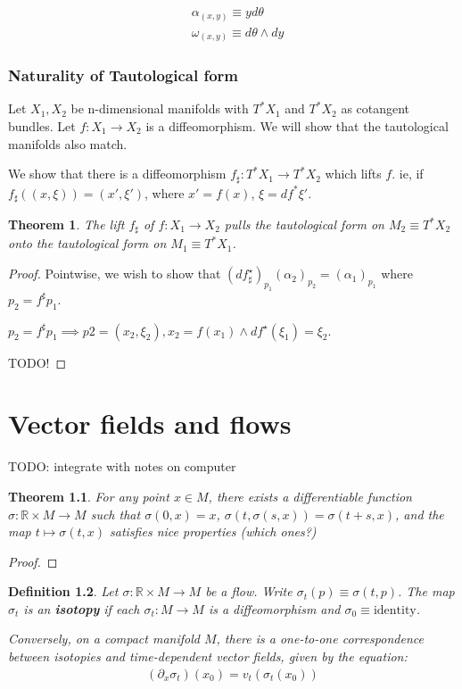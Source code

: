 \documentclass[11pt]{book}
\newcommand{\R}{\ensuremath{\mathbb R}}
\newcommand{\coT}{\ensuremath{T^*}}
\newtheorem{theorem}{Theorem}
\newtheorem{definition}[theorem]{Definition}
\newtheorem{proof}[theorem]{Proof}
\begin{document}
\begin{align*}
&\alpha_{(x, y)} \equiv y d\theta \\
&\omega_{(x, y)} \equiv d\theta \wedge dy
\end{align*}

\subsection{Naturality of Tautological form}
Let $X_1, X_2$ be n-dimensional manifolds with $T^* X_1$ and $T^* X_2$ as cotangent
bundles. Let $f: X_1 \rightarrow X_2$ is a diffeomorphism. We will show that
the tautological manifolds also match.

We show that there is a diffeomorphism $f_{\sharp}: T^*X_1 \rightarrow T^* X_2$
which lifts $f$. ie, if $f_{\sharp}((x, \xi)) = (x', \xi')$, where $x' = f(x)$,
$\xi = df^* \xi'$.

\begin{theorem} The lift $f_\sharp$ of $f: X_1 \rightarrow X_2$ pulls the
tautological form on $M_2 \equiv \coT X_2$ onto the tautological form on
$M_1 \equiv \coT X_1$.
\end{theorem}
\begin{proof}
Pointwise, we wish to show that $(df_\sharp^\star)_{p_1} (\alpha_2)_{p_2} = (\alpha_1)_{p_1}$
where $p_2 = f^\sharp p_1$.

$p_2 = f^\sharp p_1 \implies p2 = (x_2, \xi_2), x_2 = f(x_1) \land df^\star(\xi_1) = \xi_2$.

TODO!
\end{proof}

\chapter{Vector fields and flows}

TODO: integrate with notes on computer

\begin{theorem}
    For any point $x \in M$, there exists a differentiable function $\sigma: \R \times M \rightarrow M$
    such that $\sigma(0, x) = x$, $\sigma(t, \sigma(s, x)) = \sigma(t + s, x)$,
    and the map $t \mapsto \sigma(t, x)$ satisfies nice properties (which ones?)
\end{theorem}
\begin{proof}
\end{proof}

\begin{definition}
    Let $\sigma: \R \times M \rightarrow M$ be a flow. Write $\sigma_t(p) \equiv \sigma(t, p)$.
    The map $\sigma_t$ is an \textbf{isotopy} if each $\sigma_t: M \rightarrow M$
    is a diffeomorphism and $\sigma_0 \equiv \text{identity}$.


    Conversely,  on a \emph{compact} manifold $M$, there is a one-to-one correspondence
    between isotopies and time-dependent vector fields, given by the equation:
    \begin{align*}
        (\partial_x \sigma_t)(x_0) = v_t(\sigma_t(x_0))
    \end{align*}
\end{definition}
\end{document}
